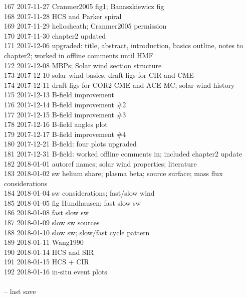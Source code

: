 \begin{footnotesize}
167	2017-11-27	Cranmer2005 fig1; Banaszkiewicz fig\\
168	2017-11-28	HCS and Parker spiral\\
169	2017-11-29	heliosheath; Cranmer2005 permission\\
170	2017-11-30	chapter2 updated\\
171	2017-12-06	upgraded: title, abstract, introduction, basics outline, notes to chapter2; worked in offline comments until HMF\\
172	2017-12-08	MBPs; Solar wind section structure\\
173	2017-12-10	solar wind basics, draft figs for CIR and CME\\
174	2017-12-11	draft figs for COR2 CME and ACE MC; solar wind history\\
175	2017-12-13	B-field improvement\\
176	2017-12-14	B-field improvement \#2\\
177	2017-12-15	B-field improvement \#3\\
178	2017-12-16	B-field angles plot\\
179	2017-12-17	B-field improvement \#4\\
180	2017-12-21	B-field: four plots upgraded\\
181	2017-12-31	B-field: worked offline comments in; included chapter2 update\\
182	2018-01-01	autoref names; solar wind properties; literature\\
183	2018-01-02	sw helium share; plasma beta; source surface; mass flux considerations\\
184	2018-01-04	sw considerations; fast/slow wind\\
185	2018-01-05	fig Hundhausen; fast slow sw\\
186	2018-01-08	fast slow sw\\
187	2018-01-09	slow sw sources\\
188	2018-01-10	slow sw; slow/fast cycle pattern\\
189	2018-01-11	Wang1990\\
190	2018-01-14	HCS and SIR\\
191	2018-01-15	HCS + CIR\\
192	2018-01-16	in-situ event plots\\
\\
\ISOToday{} \thistime{} -- last save
\end{footnotesize}

\newpage

